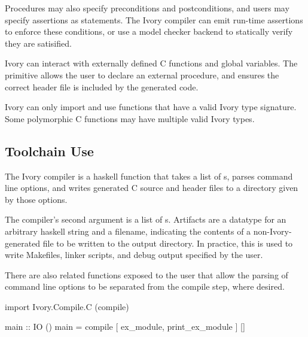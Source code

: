 Procedures may also specify preconditions and postconditions, and users may
specify assertions as statements. The Ivory compiler can emit run-time
assertions to enforce these conditions, or use a model checker backend to
statically verify they are satisified.


Ivory can interact with externally defined C functions and global
variables. The  primitive allows the user to declare an external
procedure, and ensures the correct header file is included by the generated
code.

Ivory can only import and use functions that have a valid Ivory type signature.
Some polymorphic C functions may have multiple valid Ivory types.

\subsection{Toolchain Use}
The Ivory compiler is a haskell function that takes a list of s,
parses command line options, and writes generated C source and header files to
a directory given by those options.

The compiler's second argument is a list of s. Artifacts are a
datatype for an arbitrary haskell string and a filename, indicating the contents
of a non-Ivory-generated file to be written to the output directory. In
practice, this is used to write Makefiles, linker scripts, and debug output
specified by the user.

There are also related functions exposed to the user that allow the parsing
of command line options to be separated from the compile step, where desired.

\begin{code}
import Ivory.Compile.C (compile)

main :: IO ()
main = compile [ ex_module, print_ex_module ] []
\end{code}






